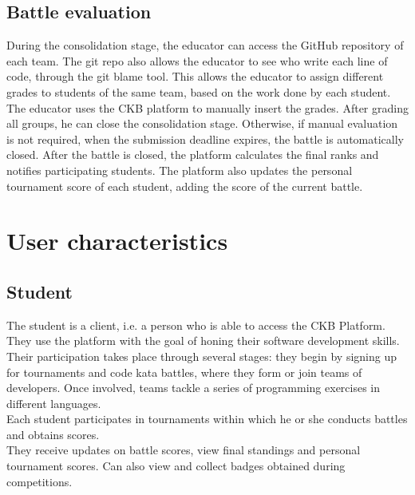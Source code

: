 \subsection{Battle evaluation}
During the consolidation stage, the educator can access the GitHub repository of each team.
The git repo also allows the educator to see who write each line of code, through the git blame tool.
This allows the educator to assign different grades to students of the same team, based on the work done by each student.
The educator uses the CKB platform to manually insert the grades.
After grading all groups, he can close the consolidation stage.
Otherwise, if manual evaluation is not required, when the submission deadline expires,
the battle is automatically closed.
After the battle is closed, the platform calculates the final ranks and notifies participating students.
The platform also updates the personal tournament score of each student, adding the score of the current battle.
\begin{adjustbox}{
		max size={\textwidth}{},
		caption={ Battle evaluation activity diagram},
		label={fig:Battle evaluation activity diagram},
		figure=H}
	\centering
\end{adjustbox}


\section{User characteristics}
\subsection{Student}
The student is a client, i.e. a person who is able to access the CKB Platform.\\
They use the platform with the goal of honing their software development skills. Their participation takes place through several stages: they begin by signing up for tournaments and code kata battles, where they form or join teams of developers. Once involved, teams tackle a series of programming exercises in different languages. \\
Each student participates in tournaments within which he or she conducts battles and obtains scores.\\
They receive updates on battle scores, view final standings and personal tournament scores. Can also view and collect badges obtained during competitions.


